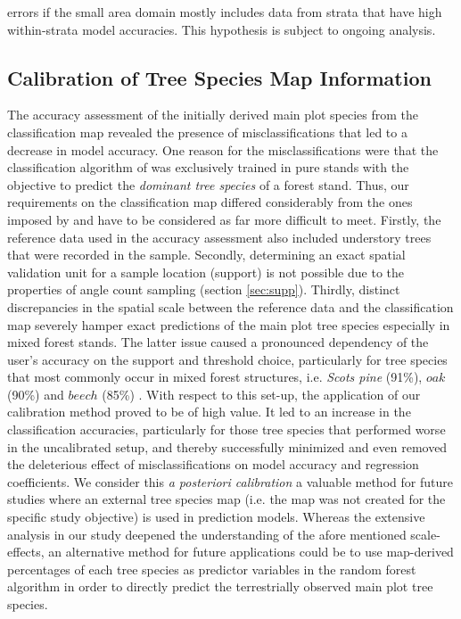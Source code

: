errors if the small area domain mostly includes data from strata that have high within-strata model accuracies. This hypothesis is subject to ongoing analysis.

\subsection{Calibration of Tree Species Map Information}
\label{sec:calib_dis}
The accuracy assessment of the initially derived main plot species from the classification map revealed the presence of misclassifications that led to a decrease in model accuracy. One reason for the misclassifications were that the classification algorithm of \citet{stoffels2015} was exclusively trained in pure stands with the objective to predict the \textit{dominant tree species} of a forest stand. Thus, our requirements on the classification map differed considerably from the ones imposed by \citet{stoffels2015} and have to be considered as far more difficult to meet. Firstly, the reference data used in the accuracy assessment also included understory trees that were recorded in the \bwi{} sample. Secondly, determining an exact spatial validation unit for a sample location (support) is not possible due to the properties of angle count sampling (section \ref{sec:supp}). Thirdly, distinct discrepancies in the spatial scale between the reference data and the classification map severely hamper exact predictions of the main plot tree species especially in mixed forest stands. The latter issue caused a pronounced dependency of the user's accuracy on the support and threshold choice, particularly for tree species that most commonly occur in mixed forest structures, i.e. \textit{Scots pine} (91\%), $oak$ (90\%) and $beech$ (85\%) \citep{bwi3}. With respect to this set-up, the application of our calibration method proved to be of high value. It led to an increase in the classification accuracies, particularly for those tree species that performed worse in the uncalibrated setup, and thereby successfully minimized and even removed the deleterious effect of misclassifications on model accuracy and regression coefficients. We consider this \textit{a posteriori calibration} a valuable method for future studies where an external tree species map (i.e. the map was not created for the specific study objective) is used in prediction models. Whereas the extensive analysis in our study deepened the understanding of the afore mentioned scale-effects, an alternative method for future applications could be to use map-derived percentages of each tree species as predictor variables in the random forest algorithm in order to directly predict the terrestrially observed main plot tree species.

